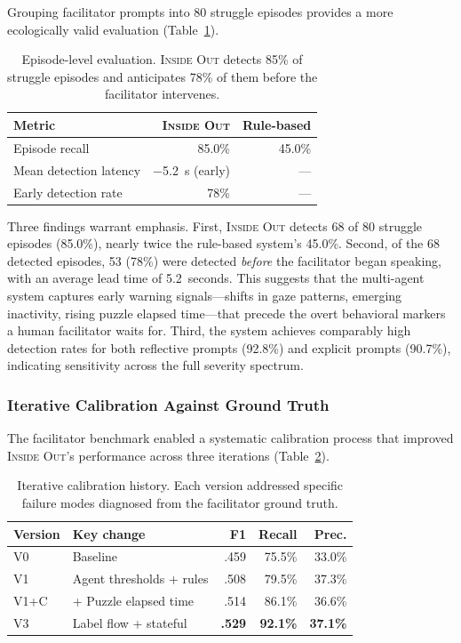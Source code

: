 Grouping facilitator prompts into 80 struggle episodes provides a more ecologically valid evaluation (Table~\ref{tab:episode_eval}).

\begin{table}[t]
\centering
\caption{Episode-level evaluation. \textsc{Inside Out} detects 85\% of struggle episodes and anticipates 78\% of them before the facilitator intervenes.}
\label{tab:episode_eval}
\small
\begin{tabular}{lrr}
\toprule
\textbf{Metric} & \textbf{\textsc{Inside Out}} & \textbf{Rule-based} \\
\midrule
Episode recall         & 85.0\% & 45.0\% \\
Mean detection latency & $-$5.2~s (early) & --- \\
Early detection rate   & 78\% & --- \\
\bottomrule
\end{tabular}
\end{table}

Three findings warrant emphasis. First, \textsc{Inside Out} detects 68 of 80 struggle episodes (85.0\%), nearly twice the rule-based system's 45.0\%. Second, of the 68 detected episodes, 53 (78\%) were detected \emph{before} the facilitator began speaking, with an average lead time of 5.2~seconds. This suggests that the multi-agent system captures early warning signals---shifts in gaze patterns, emerging inactivity, rising puzzle elapsed time---that precede the overt behavioral markers a human facilitator waits for. Third, the system achieves comparably high detection rates for both reflective prompts (92.8\%) and explicit prompts (90.7\%), indicating sensitivity across the full severity spectrum.

\subsubsection{Iterative Calibration Against Ground Truth}

The facilitator benchmark enabled a systematic calibration process that improved \textsc{Inside Out}'s performance across three iterations (Table~\ref{tab:calibration_history}).

\begin{table}[t]
\centering
\caption{Iterative calibration history. Each version addressed specific failure modes diagnosed from the facilitator ground truth.}
\label{tab:calibration_history}
\small
\begin{tabular}{llrrr}
\toprule
\textbf{Version} & \textbf{Key change} & \textbf{F1} & \textbf{Recall} & \textbf{Prec.} \\
\midrule
V0 & Baseline                    & .459 & 75.5\% & 33.0\% \\
V1 & Agent thresholds + rules    & .508 & 79.5\% & 37.3\% \\
V1+C & + Puzzle elapsed time     & .514 & 86.1\% & 36.6\% \\
V3 & Label flow + stateful       & \textbf{.529} & \textbf{92.1\%} & \textbf{37.1\%} \\
\bottomrule
\end{tabular}
\end{table}


